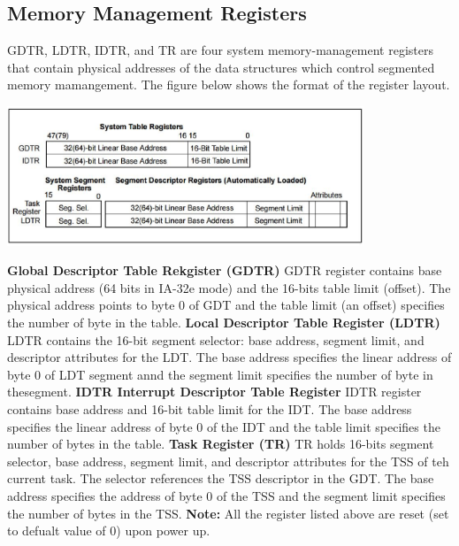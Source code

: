 \documentclass[letterpaper,10pt,titlepage,fleqn]{article}
\begin{document}
\subsection*{Memory Management Registers}
GDTR, LDTR, IDTR, and TR are four system memory-management registers that contain physical addresses of the data
structures which control segmented memory mamangement. The figure below shows the format of the register layout. 
\newline
\begin{center}
   \includegraphics[width=0.8\textwidth]{system_table_reg.eps}
\end{center}
\textbf{Global Descriptor Table Rekgister (GDTR)} \newline
GDTR register contains base physical address (64 bits in IA-32e mode) and the 16-bits table limit (offset). 
The physical address points to byte 0 of GDT and the table limit (an offset) specifies the number of byte in the table. 
\newline
\newline
\textbf{Local Descriptor Table Register (LDTR)} \newline
LDTR contains the 16-bit segment selector: base address, segment limit, and descriptor attributes for the LDT. 
The base address specifies the linear address of byte 0 of LDT segment annd the segment limit specifies the number of byte 
in thesegment. 
\newline
\newline
\textbf{IDTR Interrupt Descriptor Table Register} \newline
IDTR register contains base address and 16-bit table limit for the IDT. The base address specifies the linear address of
byte 0 of the IDT and the table limit specifies the number of bytes in the table.
\newline
\newline
\textbf{Task Register (TR)} \newline
TR holds 16-bits segment selector, base address, segment limit, and descriptor attributes for the TSS of teh current task. 
The selector references the TSS descriptor in the GDT. The base address specifies the address of byte 0 of the TSS and the
segment limit specifies the number of bytes in the TSS. 
\newline
\newline
\textbf{Note: }All the register listed above are reset (set to defualt value of 0) upon power up. 
\newline
\end{document}
